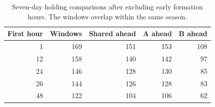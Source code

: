\begin{table}[htbp]
\centering\small
\caption{Seven-day holding comparisons after excluding early formation
hours. The windows overlap within the same season.}
\label{tab:feedbackearly}
\begin{tabular}{rrrrr}
\toprule
First hour & Windows & Shared ahead & A ahead & B ahead \\
\midrule
1 & 169 & 151 & 153 & 108 \\
12 & 158 & 140 & 142 & 97 \\
24 & 146 & 128 & 130 & 85 \\
26 & 144 & 126 & 128 & 83 \\
48 & 122 & 104 & 106 & 62 \\
\bottomrule
\end{tabular}
\end{table}
